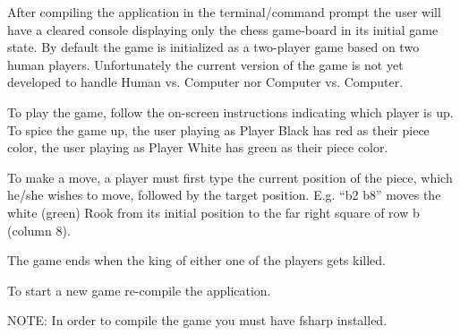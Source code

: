 \documentclass[a4paper]{report}
\begin{document}
After compiling the application in the terminal/command prompt the user will have a cleared console displaying only the chess game-board in its initial game state.
By default the game is initialized as a two-player game based on two human players. Unfortunately the current version of the game is not yet developed to handle Human vs. Computer nor Computer vs. Computer.

To play the game, follow the on-screen instructions indicating which player is up. To spice the game up, the user playing as Player Black has red as their piece color, the user playing as Player White has green as their piece color.

To make a move, a player must first type the current position of the piece, which he/she wishes to move, followed by the target position. E.g. “b2 b8” moves the white (green) Rook from its initial position to the far right square of row b (column 8).

The game ends when the king of either one of the players gets killed.

To start a new game re-compile the application.

NOTE: In order to compile the game you must have fsharp installed.
\end{document}
